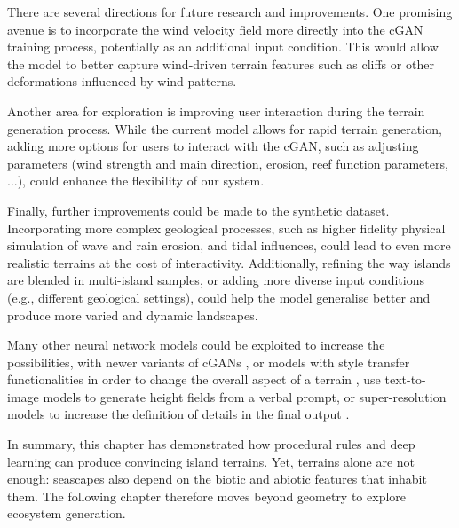 
There are several directions for future research and improvements. One promising avenue is to incorporate the wind velocity field more directly into the cGAN training process, potentially as an additional input condition. This would allow the model to better capture wind-driven terrain features such as cliffs or other deformations influenced by wind patterns.

Another area for exploration is improving user interaction during the terrain generation process. While the current model allows for rapid terrain generation, adding more options for users to interact with the cGAN, such as adjusting parameters (wind strength and main direction, erosion, reef function parameters, ...), could enhance the flexibility of our system.

Finally, further improvements could be made to the synthetic dataset. Incorporating more complex geological processes, such as higher fidelity physical simulation of wave and rain erosion, and tidal influences, could lead to even more realistic terrains at the cost of interactivity. Additionally, refining the way islands are blended in multi-island samples, or adding more diverse input conditions (e.g., different geological settings), could help the model generalise better and produce more varied and dynamic landscapes.

Many other neural network models could be exploited to increase the possibilities, with newer variants of cGANs \cite{Park2019}, or models with style transfer functionalities \cite{Gatys2015,Zhu2020} in order to change the overall aspect of a terrain \cite{Perche2023a,Perche2023b}, use text-to-image models \cite{Rombach2021,Radford2021} to generate height fields from a verbal prompt, or super-resolution models \cite{Dong2014} to increase the definition of details in the final output \cite{Guerin2016a}.

In summary, this chapter has demonstrated how procedural rules and deep learning can produce convincing island terrains. Yet, terrains alone are not enough: seascapes also depend on the biotic and abiotic features that inhabit them. The following chapter therefore moves beyond geometry to explore ecosystem generation.
